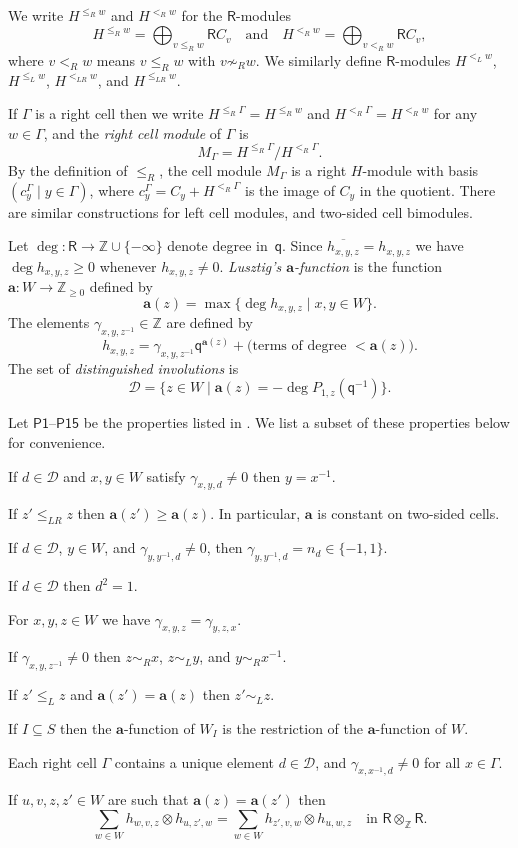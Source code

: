 \documentclass[11pt]{article}
\theoremstyle{plain}
\theoremstyle{definition}
\numberwithin{equation}{section}
\def\cD{\mathcal{D}}
\newcommand{\Ga}{\Gamma}
\def\ZZ{\mathbb{Z}}
\def\sR{\mathsf{R}}
\newcommand{\ba}{\mathbf{a}}
\newcommand{\sq}{\mathsf{q}}
\begin{document}
We write $H^{\leq_R w}$ and $H^{<_R w}$ for the $\sR$-modules
$$
H^{\leq_R w}=\bigoplus_{v\leq_R w}\sR C_v\quad\text{and}\quad H^{<_Rw}=\bigoplus_{v<_R w}\sR C_v,
$$
where $v<_Rw$ means $v\leq_R w$ with $v\not\sim_R w$. We similarly define $\sR$-modules $H^{<_Lw}$, $H^{\leq_L w}$, $H^{<_{LR}w}$, and $H^{\leq_{LR}w}$. 

If $\Ga$ is a right cell then we write $H^{\leq_R \Ga}=H^{\leq_R w}$ and $H^{<_R\Ga}=H^{<_Rw}$ for any $w\in\Ga$, and the \textit{right cell module} of $\Ga$ is 
$$
M_{\Ga}=H^{\leq_R\Ga}/H^{<_R\Ga}. 
$$
By the definition of $\leq_R$, the cell module $M_{\Ga}$ is a right $H$-module with basis $(c_y^{\Ga}\mid y\in\Ga)$, where $c_y^{\Ga}=C_y+H^{<_R\Ga}$ is the image of $C_y$ in the quotient. There are similar constructions for left cell modules, and two-sided cell bimodules. 


Let $\deg:\sR\to \ZZ\cup\{-\infty\}$ denote degree in~$\sq$. Since $\overline{h_{x,y,z}}=h_{x,y,z}$ we have $\deg h_{x,y,z}\geq 0$ whenever $h_{x,y,z}\neq 0$. \textit{Lusztig's $\ba$-function} is the function $\ba:W\to \ZZ_{\geq 0}$ defined by 
$$
\ba(z)=\max\{\deg h_{x,y,z}\mid x,y\in W\}. 
$$
The elements $\gamma_{x,y,z^{-1}}\in\ZZ$ are defined by 
$$
h_{x,y,z}=\gamma_{x,y,z^{-1}}\sq^{\ba(z)}+\text{(terms of degree $<\ba(z)$)}. 
$$
The set of \textit{distinguished involutions} is 
$$
\cD=\{z\in W\mid \ba(z)=-\deg P_{1,z}(\sq^{-1})\}. 
$$


Let $\mathsf{P1}$--$\mathsf{P15}$ be the properties listed in \cite[Conjecture~14.2]{Lus:03}. We list a subset of these properties below for convenience. 
\begin{compactenum}
\item[$\mathsf{P2}$.] If $d\in\cD$ and $x,y\in W$ satisfy $\gamma_{x,y,d}\neq 0$ then $y=x^{-1}$.
\item[$\mathsf{P4}$.] If $z'\leq _{LR}z$ then $\ba(z')\geq \ba(z)$. In particular, $\ba$ is constant on two-sided cells. 
\item[$\mathsf{P5}$.] If $d\in\cD$, $y\in W$, and $\gamma_{y,y^{-1},d}\neq 0$, then $\gamma_{y,y^{-1},d}=n_d\in\{-1,1\}$.
\item[$\mathsf{P6}$.] If $d\in\cD$ then $d^2=1$. 
\item[$\mathsf{P7}$.] For $x,y,z\in W$ we have $\gamma_{x,y,z}=\gamma_{y,z,x}$. 
\item[$\mathsf{P8}$.] If $\gamma_{x,y,z^{-1}}\neq 0$ then $z\sim_R x$, $z\sim_L y$, and $y\sim_R x^{-1}$. 
\item[$\mathsf{P9}$.] If $z'\leq_Lz$ and $\ba(z')=\ba(z)$ then $z'\sim_Lz$.
\item[$\mathsf{P12}$.] If $I\subseteq S$ then the $\ba$-function of $W_I$ is the restriction of the $\ba$-function of $W$.
\item[$\mathsf{P13}$.] Each right cell $\Ga$ contains a unique element $d\in\cD$, and $\gamma_{x,x^{-1},d}\neq 0$ for all $x\in\Ga$. 
\item[$\mathsf{P15}$.] If $u,v,z,z'\in W$ are such that $\ba(z)=\ba(z')$ then 
$$
\sum_{w\in W}h_{w,v,z}\otimes h_{u,z',w}=\sum_{w\in W}h_{z',v,w}\otimes h_{u,w,z}\quad\text{in $\sR\otimes_{\ZZ}\sR$}.
$$
\end{compactenum}
\end{document}
